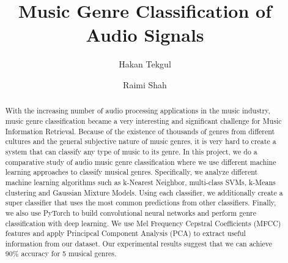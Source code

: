 \documentclass[sigconf]{acmart}
\begin{document}
\title{Music Genre Classification of Audio Signals}

\author{Hakan Tekgul}
\affiliation
{%
}

\author{Raimi Shah}




\begin{abstract}
With the increasing number of audio processing applications in the music industry, music genre classification became a very interesting and significant challenge for Music Information Retrieval. Because of the existence of thousands of genres from different cultures and the general subjective nature of music genres, it is very hard to create a system that can classify any type of music to its genre. In this project, we do a comparative study of audio music genre classification where we use different machine learning approaches to classify musical genres. Specifically, we analyze different machine learning algorithms such as k-Nearest Neighbor, multi-class SVMs, k-Means clustering and Gaussian Mixture Models. Using each classifier, we additionally create a super classifier that uses the most common predictions from other classifiers. Finally, we also use PyTorch to build convolutional neural networks and perform genre classification with deep learning. We use Mel Frequency Cepstral Coefficients (MFCC) features and apply Principcal Component Analysis (PCA) to extract useful information from our dataset. Our experimental results suggest that we can achieve 90\% accuracy for 5 musical genres. 
  

\end{abstract}




\maketitle





\end{document}
